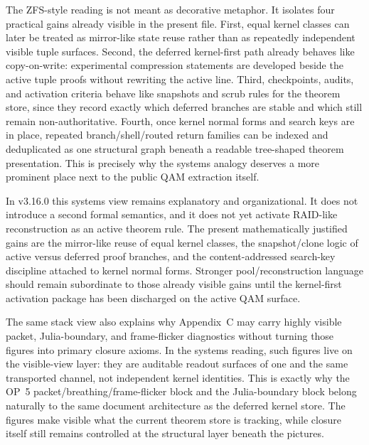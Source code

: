 \begin{remark}\label{rem:qam-zfs-utility}
The ZFS-style reading is not meant as decorative metaphor. It isolates four practical gains already visible in the present file. First, equal kernel classes can later be treated as mirror-like state reuse rather than as repeatedly independent visible tuple surfaces. Second, the deferred kernel-first path already behaves like copy-on-write: experimental compression statements are developed beside the active tuple proofs without rewriting the active line. Third, checkpoints, audits, and activation criteria behave like snapshots and scrub rules for the theorem store, since they record exactly which deferred branches are stable and which still remain non-authoritative. Fourth, once kernel normal forms and search keys are in place, repeated branch/shell/routed return families can be indexed and deduplicated as one structural graph beneath a readable tree-shaped theorem presentation. This is precisely why the systems analogy deserves a more prominent place next to the public QAM extraction itself.
\end{remark}

\begin{remark}\label{rem:qam-vm-os-scope}
In v3.16.0 this systems view remains explanatory and organizational. It does not introduce a second formal semantics, and it does not yet activate RAID-like reconstruction as an active theorem rule. The present mathematically justified gains are the mirror-like reuse of equal kernel classes, the snapshot/clone logic of active versus deferred proof branches, and the content-addressed search-key discipline attached to kernel normal forms. Stronger pool/reconstruction language should remain subordinate to those already visible gains until the kernel-first activation package has been discharged on the active QAM surface.
\end{remark}


\begin{remark}\label{rem:qam-vm-os-visuals}
The same stack view also explains why Appendix~C may carry highly visible packet, Julia-boundary, and frame-flicker diagnostics without turning those figures into primary closure axioms. In the systems reading, such figures live on the visible-view layer: they are auditable readout surfaces of one and the same transported channel, not independent kernel identities. This is exactly why the OP~5 packet/breathing/frame-flicker block and the Julia-boundary block belong naturally to the same document architecture as the deferred kernel store. The figures make visible what the current theorem store is tracking, while closure itself still remains controlled at the structural layer beneath the pictures.
\end{remark}


